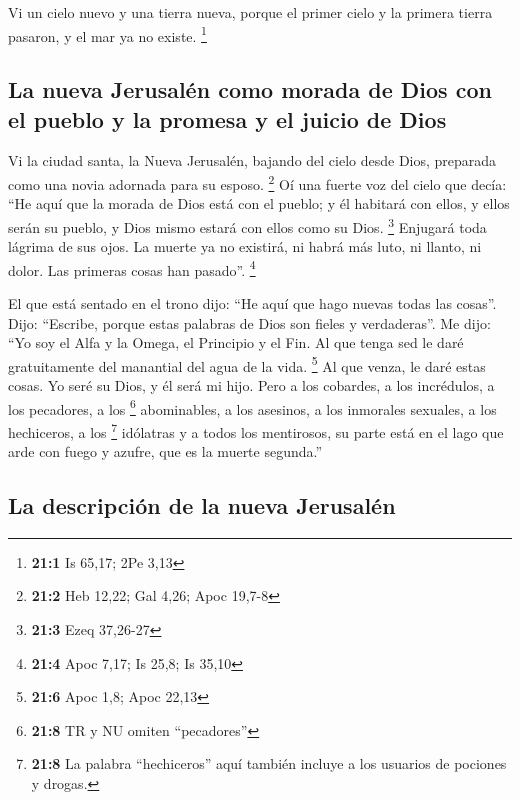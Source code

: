 \begin{paracol}{2}
 Vi un cielo nuevo y una tierra nueva, porque el primer
cielo y la primera tierra pasaron, y el mar ya no existe. \footnote{\textbf{21:1}
  Is 65,17; 2Pe 3,13}

\hypertarget{la-nueva-jerusaluxe9n-como-morada-de-dios-con-el-pueblo-y-la-promesa-y-el-juicio-de-dios}{%
\subsection{La nueva Jerusalén como morada de Dios con el pueblo y la
promesa y el juicio de
Dios}\label{la-nueva-jerusaluxe9n-como-morada-de-dios-con-el-pueblo-y-la-promesa-y-el-juicio-de-dios}}

 Vi la ciudad santa, la Nueva Jerusalén, bajando del cielo
desde Dios, preparada como una novia adornada para su esposo.
\footnote{\textbf{21:2} Heb 12,22; Gal 4,26; Apoc 19,7-8} 
Oí una fuerte voz del cielo que decía: ``He aquí que la morada de Dios
está con el pueblo; y él habitará con ellos, y ellos serán su pueblo, y
Dios mismo estará con ellos como su Dios. \footnote{\textbf{21:3} Ezeq
  37,26-27}  Enjugará toda lágrima de sus ojos. La muerte
ya no existirá, ni habrá más luto, ni llanto, ni dolor. Las primeras
cosas han pasado''. \footnote{\textbf{21:4} Apoc 7,17; Is 25,8; Is 35,10}

 El que está sentado en el trono dijo: ``He aquí que hago
nuevas todas las cosas''. Dijo: ``Escribe, porque estas palabras de Dios
son fieles y verdaderas''.  Me dijo: ``Yo soy el Alfa y la
Omega, el Principio y el Fin. Al que tenga sed le daré gratuitamente del
manantial del agua de la vida. \footnote{\textbf{21:6} Apoc 1,8; Apoc
  22,13}  Al que venza, le daré estas cosas. Yo seré su
Dios, y él será mi hijo.  Pero a los cobardes, a los
incrédulos, a los pecadores, a los \footnote{\textbf{21:8} TR y NU
  omiten ``pecadores''} abominables, a los asesinos, a los inmorales
sexuales, a los hechiceros, a los \footnote{\textbf{21:8} La palabra
  ``hechiceros'' aquí también incluye a los usuarios de pociones y
  drogas.} idólatras y a todos los mentirosos, su parte está en el lago
que arde con fuego y azufre, que es la muerte segunda.''

\hypertarget{la-descripciuxf3n-de-la-nueva-jerusaluxe9n}{%
\subsection{La descripción de la nueva
Jerusalén}\label{la-descripciuxf3n-de-la-nueva-jerusaluxe9n}}


\end{paracol}
